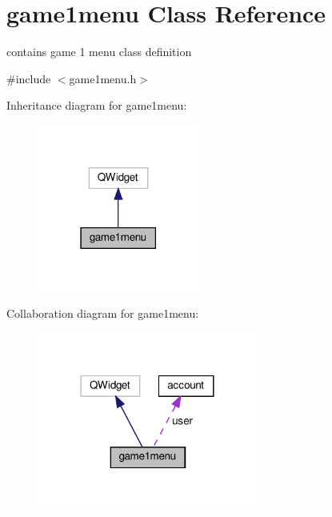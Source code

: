 \hypertarget{classgame1menu}{}\section{game1menu Class Reference}
\label{classgame1menu}


contains game 1 menu class definition  




{\ttfamily \#include $<$game1menu.\+h$>$}



Inheritance diagram for game1menu\+:\nopagebreak
\begin{figure}[H]
\begin{center}
\leavevmode
\includegraphics[width=150pt]{classgame1menu__inherit__graph}
\end{center}
\end{figure}


Collaboration diagram for game1menu\+:\nopagebreak
\begin{figure}[H]
\begin{center}
\leavevmode
\includegraphics[width=204pt]{classgame1menu__coll__graph}
\end{center}
\end{figure}
